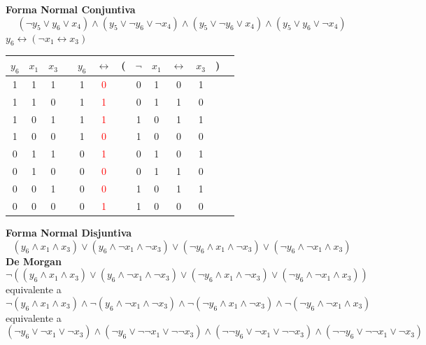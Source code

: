 \documentclass[a4paper]{article}
\begin{document}
\textbf{Forma Normal Conjuntiva}
\[
    \left(\neg y_{5} \lor y_{6} \lor x_{4}\right) \land \left(y_{5} \lor \neg y_{6} \lor \neg x_{4}\right) \land
    \left(y_{5} \lor \neg y_{6} \lor x_{4} \right) \land \left(y_{5} \lor y_{6} \lor \neg x_{4}\right) %
\]
\newpage
\(y_{6} \longleftrightarrow \left(\neg x_{1} \longleftrightarrow x_{3}\right)\)
\newline
\begin{tabular}{@{ }c@{ }@{ }c@{ }@{ }c | c@{ }@{ }c@{ }@{ }c@{ }@{}c@{}@{ }c@{ }@{ }c@{ }@{ }c@{ }@{ }c@{ }@{}c@{}@{ }c}
    \(y_{6}\) & \(x_{1}\) & \(x_{3}\) &  & \(y_{6}\) & $\leftrightarrow$ & ( & $\lnot$ & \(x_{1}\) & $\leftrightarrow$ & \(x_{3}\) & ) & \\
    \hline 
    1 & 1 & 1 &  & 1 & \textcolor{red}{0} &  & 0 & 1 & 0 & 1 &  & \\
    1 & 1 & 0 &  & 1 & \textcolor{red}{1} &  & 0 & 1 & 1 & 0 &  & \\
    1 & 0 & 1 &  & 1 & \textcolor{red}{1} &  & 1 & 0 & 1 & 1 &  & \\
    1 & 0 & 0 &  & 1 & \textcolor{red}{0} &  & 1 & 0 & 0 & 0 &  & \\
    0 & 1 & 1 &  & 0 & \textcolor{red}{1} &  & 0 & 1 & 0 & 1 &  & \\
    0 & 1 & 0 &  & 0 & \textcolor{red}{0} &  & 0 & 1 & 1 & 0 &  & \\
    0 & 0 & 1 &  & 0 & \textcolor{red}{0} &  & 1 & 0 & 1 & 1 &  & \\
    0 & 0 & 0 &  & 0 & \textcolor{red}{1} &  & 1 & 0 & 0 & 0 &  & \\
\end{tabular}
\newline
\textbf{Forma Normal Disjuntiva}
\[
    \left(y_{6} \land x_{1} \land x_{3}\right) \lor \left(y_{6} \land \neg x_{1} \land \neg x_{3}\right) \lor
    \left(\neg y_{6} \land x_{1} \land \neg x_{3}\right) \lor \left(\neg y_{6} \land \neg x_{1} \land x_{3}\right)
\]
\textbf{De Morgan}
\[
    \neg \left(\left(y_{6} \land x_{1} \land x_{3}\right) \lor \left(y_{6} \land \neg x_{1} \land \neg x_{3}\right) \lor
    \left(\neg y_{6} \land x_{1} \land \neg x_{3}\right) \lor \left(\neg y_{6} \land \neg x_{1} \land x_{3}\right)\right)
\]
equivalente a
\[
    \neg \left(y_{6} \land x_{1} \land x_{3}\right) \land \neg \left(y_{6} \land \neg x_{1} \land \neg x_{3}\right) \land
    \neg \left(\neg y_{6} \land x_{1} \land \neg x_{3}\right) \land \neg \left(\neg y_{6} \land \neg x_{1} \land x_{3}\right)
\]
equivalente a
\[
    \left(\neg y_{6} \lor \neg x_{1} \lor \neg x_{3}\right) \land \left(\neg y_{6} \lor \neg \neg x_{1} \lor \neg \neg x_{3}\right) \land
    \left(\neg \neg y_{6} \lor \neg x_{1} \lor \neg \neg x_{3}\right) \land \left(\neg \neg y_{6} \lor \neg \neg x_{1} \lor \neg x_{3}\right)
\]
\end{document}
